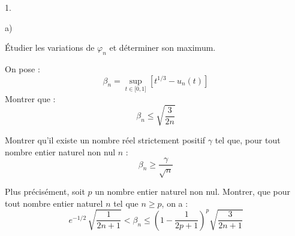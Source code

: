 \documentclass[11pt]{article}%
\begin{document}
\begin{noliste}{1.}
\begin{noliste}{a)}
 \setlength{\itemsep}{2mm}
\item Étudier les variations de $\varphi_{n}$ et déterminer son
maximum. 

\item On pose : 
\[
\beta_{n} = \sup_{t\in \lbrack 0,1]}\left[ t^{1/3}-u_{n}(t)\right] 
\]
Montrer que : 
\[
\beta_{n}\leq \sqrt{\frac{3}{2n}}
\]

\item Montrer qu'il existe un nombre réel strictement positif $\gamma $
tel
que, pour tout nombre entier naturel non nul $n$ : 
\[
\beta_{n}\geq \frac{\gamma }{\sqrt{n}}
\]

\item Plus précisément, soit $p$ un nombre entier naturel non nul.
Montrer,
que pour tout nombre entier naturel $n$ tel que $n\geq p$, on a : 
\[
e^{-1/2}\,\sqrt{\frac{1}{2n + 1}}<\beta_{n}\leq \left( 1-\frac{1}{2p +
1}\right) ^{p}\sqrt{\frac{3}{2n + 1}}
\]
\end{noliste}
\end{noliste}

\label{fin}
\end{document}
